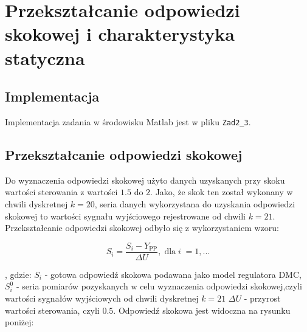 \chapter{Przekształcanie odpowiedzi skokowej i charakterystyka statyczna}
    \section{Implementacja}
    Implementacja zadania w środowisku Matlab jest w pliku \texttt{Zad2\_3}.
    \section{Przekształcanie odpowiedzi skokowej}
    Do wyznaczenia odpowiedzi skokowej użyto danych uzyskanych przy skoku wartości sterowania z wartości $\num{1,5}$ do $2$. Jako, że skok ten został wykonany w chwili dyskretnej $k=20$, seria danych wykorzystana do uzyskania odpowiedzi skokowej to wartości sygnału wyjściowego rejestrowane od chwili $k=21$. Przekształcanie odpowiedzi skokowej odbyło się z wykorzystaniem wzoru:
    
    \begin{equation}
    S_i=\frac{ {S_i-Y_{\mathrm{PP}}} }{\Delta{U}}\mathrm{,\;dla\;}{ i}\mathrm{\;= 1,...}
    \end{equation}
    
    , gdzie:\newline 
    $S_{i}$ - gotowa odpowiedź skokowa podawana jako model regulatora DMC, \newline
    $S_{i}^0$  - seria pomiarów pozyskanych w celu wyznaczenia odpowiedzi skokowej,czyli wartości sygnałów wyjściowych od chwili dyskretnej $k=21$ \newline
    $\Delta{U}$ - przyrost wartości sterowania, czyli $\num{0,5}$.\newline
    Odpowiedź skokowa jest widoczna na rysunku poniżej:



